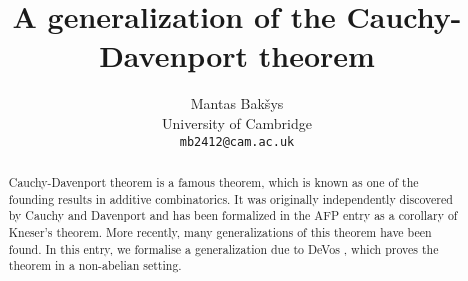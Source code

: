 \documentclass[11pt,a4paper]{article}
\begin{document}
\title{A generalization of the Cauchy-Davenport theorem}
\author{Mantas Bak\v{s}ys \\
University of Cambridge\\
\texttt{mb2412@cam.ac.uk}}

\maketitle

\begin{abstract}
Cauchy-Davenport theorem is a famous theorem, which is known as one of the founding results in additive combinatorics.
It was originally independently discovered by Cauchy \cite{cauchy1812recherches} and Davenport \cite{davenport} and has been formalized in the AFP entry \cite{Kneser_Cauchy_Davenport-AFP} as a corollary of Kneser's theorem.
More recently, many generalizations of this theorem have been found. In this entry, we formalise a generalization due to DeVos \cite{DeVos2016OnAG}, which proves the theorem in a non-abelian setting.
\end{abstract}
\newpage
\tableofcontents

\newpage






\end{document}
